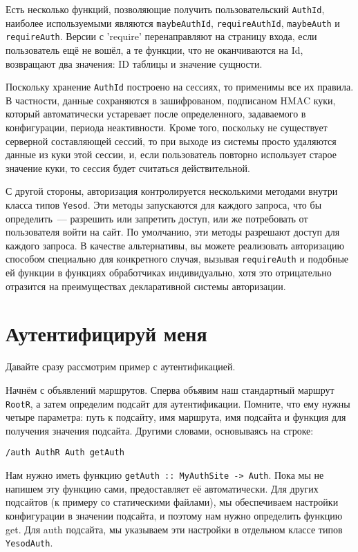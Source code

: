 Есть несколько функций, позволяющие получить пользовательский \lstinline'AuthId', наиболее используемыми являются \lstinline'maybeAuthId', \lstinline'requireAuthId', \lstinline'maybeAuth' и \lstinline'requireAuth'. Версии с 'require' перенаправляют на страницу входа, если пользователь ещё не вошёл, а те функции, что не оканчиваются на Id, возвращают два значения: ID таблицы и значение сущности.

Поскольку хранение \lstinline'AuthId' построено на сессиях, то применимы все их правила. В частности, данные сохраняются в зашифрованом, подписаном HMAC куки, который автоматически устаревает после определенного, задаваемого в конфигурации, периода неактивности. Кроме того, поскольку не существует серверной составляющей сессий, то при выходе из системы просто удаляются данные из куки этой сессии, и, если пользователь повторно использует старое значение куки, то сессия будет считаться действительной.

С другой стороны, авторизация контролируется несколькими методами внутри класса типов \lstinline'Yesod'. Эти методы запускаются для каждого запроса, что бы определить~--- разрешить или запретить доступ, или же потребовать от пользователя войти на сайт. По умолчанию, эти методы разрешают доступ для каждого запроса. В качестве альтернативы, вы можете реализовать авторизацию способом специально для конкретного случая, вызывая \lstinline'requireAuth' и подобные ей функции в функциях обработчиках индивидуально, хотя это отрицательно отразится на преимуществах декларативной системы авторизации.

\section{Аутентифицируй меня}

Давайте сразу рассмотрим пример с аутентификацией.


Начнём с объявлений маршрутов. Сперва объявим наш стандартный маршрут \lstinline'RootR', а затем определим подсайт для аутентификации. Помните, что ему нужны четыре параметра: путь к подсайту, имя маршрута, имя подсайта и функция для получения значения подсайта. Другими словами, основываясь на строке:

\begin{lstlisting}
/auth AuthR Auth getAuth
\end{lstlisting}

Нам нужно иметь функцию \lstinline'getAuth :: MyAuthSite -> Auth'. Пока мы не напишем эту функцию сами,  предоставляет её автоматически. Для других подсайтов (к примеру со статическими файлами), мы обеспечиваем настройки конфигурации в значении подсайта, и поэтому нам нужно определить функцию get. Для auth подсайта, мы указываем эти настройки в отдельном классе типов \lstinline'YesodAuth'.

